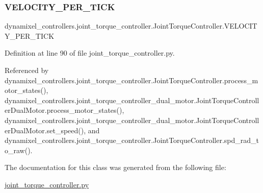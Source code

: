 \subsubsection{\texorpdfstring{V\+E\+L\+O\+C\+I\+T\+Y\+\_\+\+P\+E\+R\+\_\+\+T\+I\+CK}{VELOCITY\_PER\_TICK}}
{\footnotesize\ttfamily dynamixel\+\_\+controllers.\+joint\+\_\+torque\+\_\+controller.\+Joint\+Torque\+Controller.\+V\+E\+L\+O\+C\+I\+T\+Y\+\_\+\+P\+E\+R\+\_\+\+T\+I\+CK}



Definition at line 90 of file joint\+\_\+torque\+\_\+controller.\+py.



Referenced by dynamixel\+\_\+controllers.\+joint\+\_\+torque\+\_\+controller.\+Joint\+Torque\+Controller.\+process\+\_\+motor\+\_\+states(), dynamixel\+\_\+controllers.\+joint\+\_\+torque\+\_\+controller\+\_\+dual\+\_\+motor.\+Joint\+Torque\+Controller\+Dual\+Motor.\+process\+\_\+motor\+\_\+states(), dynamixel\+\_\+controllers.\+joint\+\_\+torque\+\_\+controller\+\_\+dual\+\_\+motor.\+Joint\+Torque\+Controller\+Dual\+Motor.\+set\+\_\+speed(), and dynamixel\+\_\+controllers.\+joint\+\_\+torque\+\_\+controller.\+Joint\+Torque\+Controller.\+spd\+\_\+rad\+\_\+to\+\_\+raw().



The documentation for this class was generated from the following file\+:\begin{DoxyCompactItemize}
\item 
\hyperlink{joint__torque__controller_8py}{joint\+\_\+torque\+\_\+controller.\+py}\end{DoxyCompactItemize}
